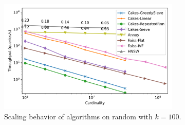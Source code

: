 \documentclass{article}
\begin{document}
\begin{figure}[ht!]
    \centering
    \includegraphics[width=3.4in]{plots/random-knn-100.png}
    \caption{
        Scaling behavior of algorithms on random with $k=100$. 
    }
    \label{fig:supplement:random-k-100}
\end{figure}
\end{document}
